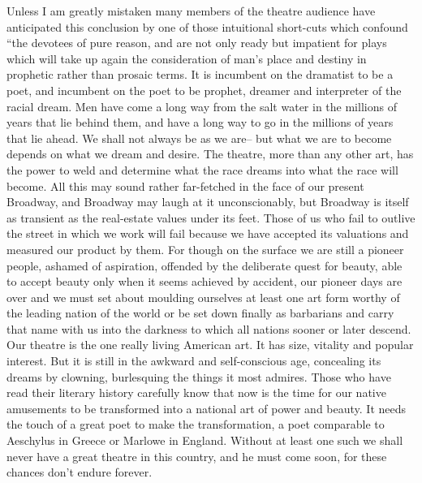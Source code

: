 \documentclass[9pt,twoside]{extarticle}
\begin{document}
Unless I am greatly mistaken many members of the theatre audience have anticipated this conclusion by one of those intuitional short-cuts which confound ``the devotees of pure reason, and are not only ready but impatient for plays which will take up again the consideration of man's place and destiny in prophetic rather than prosaic terms. It is incumbent on the dramatist to be a poet, and incumbent on the poet to be prophet, dreamer and interpreter of the racial dream. Men have come a long way from the salt water in the millions of years that lie behind them, and have a long way to go in the millions of years that lie ahead. We shall not always be as we are-- but what we are to become depends on what we dream and desire. The theatre, more than any other art, has the power to weld and determine what the race dreams into what the race will become. All this may sound rather far-fetched in the face of our present Broadway, and Broadway may laugh at it unconscionably, but Broadway is itself as transient as the real-estate values under its feet. Those of us who fail to outlive the street in which we work will fail because we have accepted its valuations and measured our product by them. For though on the surface we are still a pioneer people, ashamed of aspiration, offended by the deliberate quest for beauty, able to accept beauty only when it seems achieved by accident, our pioneer days are over and we must set about moulding ourselves at least one art form worthy of the leading nation of the world or be set down finally as barbarians and carry that name with us into the darkness to which all nations sooner or later descend. Our theatre is the one really living American art. It has size, vitality and popular interest. But it is still in the awkward and self-conscious age, concealing its dreams by clowning, burlesquing the things it most admires. Those who have read their literary history carefully know that now is the time for our native amusements to be transformed into a national art of power and beauty. It needs the touch of a great poet to make the transformation, a poet comparable to Aeschylus in Greece or Marlowe in England. Without at least one such we shall never have a great theatre in this country, and he must come soon, for these chances don't endure forever.
\end{document}
